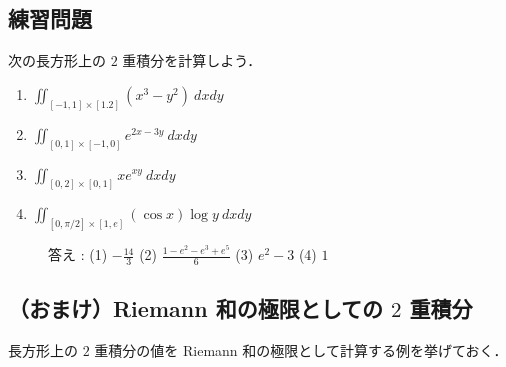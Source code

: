 \documentclass[10pt, uplatex, dvipdfmx]{jsarticle}
\theoremstyle{definition}
\numberwithin{equation}{section}
\newcommand{\ds}{\displaystyle}
\begin{document}
\newpage

\subsection{練習問題}

次の長方形上の $2$ 重積分を計算しよう．

\vspace{1zh}

\begin{enumerate}[(1)]

  \setlength{\itemsep}{2zh}
  
\item $\ds \iint_{[-1,1] \times [1.2]} \left( x^3-y^2\right) \ dx dy$

\item $\ds \iint_{[0,1] \times [-1,0]} e^{2x-3y} \ dx dy$

\item $\ds \iint_{[0,2] \times [0,1]} x e^{xy} \ dx dy$

\item $\ds \iint_{\left[0, \pi/2\right] \times [1,e]} \left( \cos x \right) \log y \ dx dy$
\end{enumerate}

\begin{figure}[b]
答え : (1) $\ds -\frac{14}{3}$ \quad (2) $\ds \frac{1-e^2-e^3+e^5}{6}$ \quad (3) $\ds e^2-3$ \quad (4) $1$
\end{figure}

\newpage

\subsection{（おまけ）Riemann 和の極限としての $2$ 重積分}

\vspace{1zh}

長方形上の $2$ 重積分の値を Riemann 和の極限として計算する例を挙げておく．\\
\end{document}
